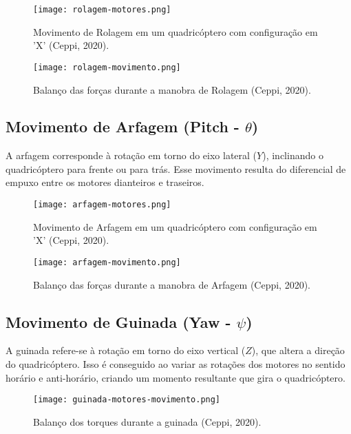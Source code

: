 \begin{figure}[H]
	\centering
	\texttt{[image: rolagem-motores.png]}
	\caption{Movimento de Rolagem em um quadricóptero com configuração em 'X' (Ceppi, 2020).}
	\label{fig:roll_maneuver}
\end{figure}

\begin{figure}[H]
	\centering
	\texttt{[image: rolagem-movimento.png]}
	\caption{Balanço das forças durante a manobra de Rolagem (Ceppi, 2020).}
	\label{fig:roll_maneuver_forces}
\end{figure}

\subsection{Movimento de Arfagem (Pitch - $\theta$)}
A arfagem corresponde à rotação em torno do eixo lateral (\(Y\)), inclinando o quadricóptero para frente ou para trás. Esse movimento resulta do diferencial de empuxo entre os motores dianteiros e traseiros.

\begin{figure}[H]
	\centering
	\texttt{[image: arfagem-motores.png]}
	\caption{Movimento de Arfagem em um quadricóptero com configuração em 'X' (Ceppi, 2020).}
	\label{fig:pitch_maneuver}
\end{figure}

\begin{figure}[H]
	\centering
	\texttt{[image: arfagem-movimento.png]}
	\caption{Balanço das forças durante a manobra de Arfagem (Ceppi, 2020).}
	\label{fig:pitch_maneuver_forces}
\end{figure}

\subsection{Movimento de Guinada (Yaw - $\psi$)}
A guinada refere-se à rotação em torno do eixo vertical (\(Z\)), que altera a direção do quadricóptero. Isso é conseguido ao variar as rotações dos motores no sentido horário e anti-horário, criando um momento resultante que gira o quadricóptero.

\begin{figure}[H]
	\centering
	\texttt{[image: guinada-motores-movimento.png]}
	\caption{Balanço dos torques durante a guinada (Ceppi, 2020).}
	\label{fig:yaw_torques}
\end{figure}

